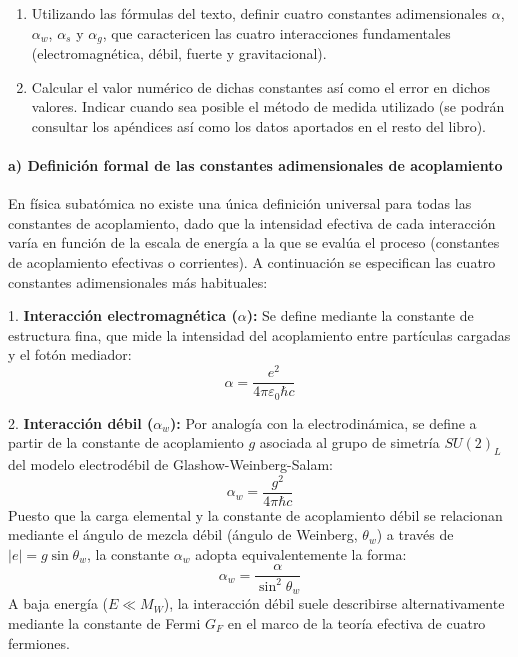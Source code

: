 \begin{problema}
\begin{enumerate}[label=\alph*)]
    \item Utilizando las fórmulas del texto, definir cuatro constantes adimensionales $\alpha$, $\alpha_w$, $\alpha_s$ y $\alpha_g$, que caractericen las cuatro interacciones fundamentales (electromagnética, débil, fuerte y gravitacional).
    \item Calcular el valor numérico de dichas constantes así como el error en dichos valores. Indicar cuando sea posible el método de medida utilizado (se podrán consultar los apéndices así como los datos aportados en el resto del libro).
\end{enumerate}

\tcblower

\paragraph{a) Definición formal de las constantes adimensionales de acoplamiento}

En física subatómica no existe una única definición universal para todas las constantes de acoplamiento, dado que la intensidad efectiva de cada interacción varía en función de la escala de energía a la que se evalúa el proceso (constantes de acoplamiento efectivas o corrientes). A continuación se especifican las cuatro constantes adimensionales más habituales:

1. \textbf{Interacción electromagnética ($\alpha$):} Se define mediante la constante de estructura fina, que mide la intensidad del acoplamiento entre partículas cargadas y el fotón mediador:
\begin{equation}
\alpha = \frac{e^2}{4\pi \varepsilon_0 \hbar c}
\end{equation}

2. \textbf{Interacción débil ($\alpha_w$):} Por analogía con la electrodinámica, se define a partir de la constante de acoplamiento $g$ asociada al grupo de simetría $SU(2)_L$ del modelo electrodébil de Glashow-Weinberg-Salam:
\begin{equation}
\alpha_w = \frac{g^2}{4\pi \hbar c}
\end{equation}
Puesto que la carga elemental y la constante de acoplamiento débil se relacionan mediante el ángulo de mezcla débil (ángulo de Weinberg, $\theta_w$) a través de $|e| = g \sin\theta_w$, la constante $\alpha_w$ adopta equivalentemente la forma:
\begin{equation}
\alpha_w = \frac{\alpha}{\sin^2\theta_w}
\end{equation}
A baja energía ($E \ll M_W$), la interacción débil suele describirse alternativamente mediante la constante de Fermi $G_F$ en el marco de la teoría efectiva de cuatro fermiones.


\end{problema}
